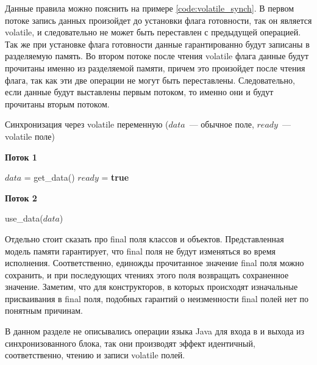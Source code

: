 \documentclass[14pt,titlepage]{extarticle}
\newcommand{\algorithmictitle}[1]{\hspace{8mm}\textbf{#1}}
\newcommand{\BOOLTRUE}{\textbf{true }}
\newcommand{\eng}[1]{{\English#1}}
\begin{document}
      Данные правила можно пояснить на примере \ref{code:volatile_synch}.
      В первом потоке запись данных произойдет до установки флага готовности,
      так он является \eng{volatile}, и следовательно не может быть переставлен
      с предыдущей операцией. Так же при установке флага готовности данные
      гарантированно будут записаны в разделяемую память.
      Во втором потоке после чтения \eng{volatile} флага данные будут прочитаны
      именно из разделяемой памяти, причем это произойдет после чтения флага,
      так как эти две операции не могут быть переставлены.
      Следовательно, если данные будут выставлены первым потоком, то именно
      они и будут прочитаны вторым потоком.
      \begin{algorithm}
        \caption{Синхронизация через \eng{volatile} переменную
          ($data$~--- обычное поле, $ready$~--- \eng{volatile} поле)}
        \label{code:volatile_synch}
        \begin{multicols*}{2}
          \algorithmictitle{Поток 1}
          \begin{algorithmic}[1]
            \STATE $data$ = get\_data()
            \STATE $ready$ = \BOOLTRUE
          \end{algorithmic}
          \columnbreak
          \algorithmictitle{Поток 2}
          \begin{algorithmic}[1]
            \STATE {}
            \ENDWHILE
            \STATE use\_data($data$)
          \end{algorithmic}
        \end{multicols*}
      \end{algorithm}

      Отдельно стоит сказать про \eng{final} поля классов и объектов.
      Представленная модель памяти гарантирует, что \eng{final} поля не будут
      изменяться во время исполнения. Соответственно, единожды прочитанное
      значение \eng{final} поля можно сохранить, и при последующих чтениях
      этого поля возвращать сохраненное значение.
      Заметим, что для конструкторов, в которых происходят изначальные
      присваивания в \eng{final} поля, подобных гарантий о неизменности
      \eng{final} полей нет по понятным причинам.

      В данном разделе не описывались операции языка Java для входа в и выхода
      из синхронизованного блока, так они производят эффект идентичный,
      соответственно, чтению и записи \eng{volatile} полей.
\end{document}

